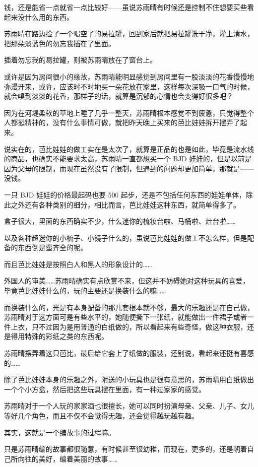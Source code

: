 钱，还是能省一点就省一点比较好——虽说苏雨晴有时候还是控制不住想要买些看起来没什么用的东西。

苏雨晴在路边捡了一个喝空了的易拉罐，回到家后就把易拉罐洗干净，灌上清水，把那朵淡蓝色的勿忘我插在了里面。

插着勿忘我的易拉罐，则被苏雨晴放在了窗台上。

或许是因为房间很小的缘故，苏雨晴能明显感觉到房间里有一股淡淡的花香慢慢地弥漫开来，或许，应该时不时地买一朵花放在家里，这样每次深吸一口气的时候，就会嗅到淡淡的花香，那样子的话，就算是沉郁的心情也会变得好很多吧？

因为在河堤柔软的草地上睡了几乎一整天，苏雨晴根本感觉不到疲惫，只觉得整个人都挺精神的，没有什么事情可做，就把昨天晚上买来的芭比娃娃拆开摆弄了起来。

说实在的，芭比娃娃的做工实在是太次了，就算是正品的也是如此，毕竟是流水线的商品，也确实不能要求太高，苏雨晴一直都想买一个 BJD 娃娃的，但是以前是因为父母的限制，而现在虽然没有了限制，但遇到的问题却更加简单，那就是——没钱。

一只 BJD 娃娃的价格最起码也要 500 起步，还是不包括任何东西的娃娃单体，除此之外还有各种类别的细分，相比而言，芭比娃娃这种东西，就简单得多了。

盒子很大，里面的东西确实不少，什么迷你的梳妆台啦、马桶啦、灶台啦……

以及各种超迷你的小梳子、小镜子什么的，虽说芭比娃娃的做工不怎么样，但是配备的东西倒是蛮齐全的呢。

而且芭比娃娃是按照白人和黑人的形象设计的……

外国人的审美……苏雨晴确实有点欣赏不来，但这并不妨碍她对这种玩具的喜爱，毕竟芭比娃娃什么的，玩的主要还是换装什么的嘛……

而换装什么的，光是有本身配备的那几套根本就不够，最大的乐趣还是在自己做，苏雨晴对于这方面可是有些水平的，她随便撕下一张纸，就能做出一件裙子或者一件上衣，只不过因为是用普通的白纸做的，所以看起来有些奇怪，做这种衣服，还是得用特殊的彩纸之类的东西呢。

苏雨晴摆弄着这只芭比，最后给它套上了纸做的服装，还别说，看起来还挺有喜感的……

除了芭比娃娃本身的乐趣之外，附送的小玩具也是很有意思的，苏雨晴用白纸做出一个个小方盒，然后把这些玩具摆在里面，有一种过家家的感觉。

苏雨晴对于一个人玩的家家酒也很擅长，她可以同时扮演母亲、父亲、儿子、女儿等好几个角色，而且不仅不会觉得无趣，还会觉得越玩越有趣。

其实，这就是一个编故事的过程嘛。

只是苏雨晴编的故事都很随意，有时候甚至很幼稚，而现在，更多的，还是朝着自己所向往的美好，编着美丽的故事……

